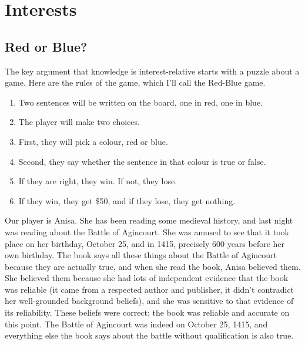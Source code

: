 \documentclass[
  10pt,
  letterpaper,
  twoside]{scrbook}
\providecommand{\tightlist}{%
  \setlength{\itemsep}{0pt}\setlength{\parskip}{0pt}}\usepackage{longtable,booktabs,array}
\begin{document}

\chapter{Interests}\label{sec-interests}

\section{Red or Blue?}\label{sec-redblue}

The key argument that knowledge is interest-relative starts with a
puzzle about a game. Here are the rules of the game, which I'll call the
Red-Blue game.

\begin{enumerate}
\def\labelenumi{\arabic{enumi}.}
\tightlist
\item
  Two sentences will be written on the board, one in red, one in blue.
\item
  The player will make two choices.
\item
  First, they will pick a colour, red or blue.
\item
  Second, they say whether the sentence in that colour is true or false.
\item
  If they are right, they win. If not, they lose.
\item
  If they win, they get \$50, and if they lose, they get nothing.
\end{enumerate}

Our player is Anisa. She has been reading some medieval history, and
last night was reading about the Battle of Agincourt. She was amused to
see that it took place on her birthday, October 25, and in 1415,
precisely 600 years before her own birthday. The book says all these
things about the Battle of Agincourt because they are actually true, and
when she read the book, Anisa believed them. She believed them because
she had lots of independent evidence that the book was reliable (it came
from a respected author and publisher, it didn't contradict her
well-grounded background beliefs), and she was sensitive to that
evidence of its reliability. These beliefs were correct; the book was
reliable and accurate on this point. The Battle of Agincourt was indeed
on October 25, 1415, and everything else the book says about the battle
without qualification is also true.
\end{document}
